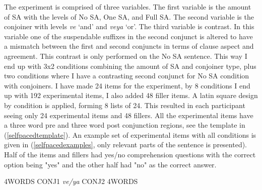 The experiment is comprised of three variables. The first variable is the amount of SA with the levels of No SA, One SA, and Full SA. The second variable is the conjoiner with levels \textit{ve} `and' and \textit{veya} `or'. The third variable is contrast. In this variable one of the suspendable suffixes in the second conjunct is altered to have a mismatch between the first and second conjuncts in terms of clause aspect and agreement. This contrast is only performed on the No SA sentence. This way I end up with 3x2 conditions combining the amount of SA and conjoiner type, plus two conditions where I have a contrasting second conjunct for No SA condition with conjoiners. I have made 24 items for the experiment, by 8 conditions I end up with 192 experimental items, I also added 48 filler items. A latin square design by condition is applied, forming 8 lists of 24. This resulted in each participant seeing only 24 experimental items and 48 fillers. All the experimental items have a three word pre and three word post conjunction regions, see the template in (\ref{selfpacedtemplate}). An example set of experimental items with all conditions is given in (\ref{selfpacedexamples}, only relevant parts of the sentence is presented). Half of the items and fillers had yes/no comprehension questions with the correct option being "yes" and the other half had "no" as the correct answer.
\begin{exe}
\ex \label{selfpacedtemplate}
4WORDS CONJ1 \textit{ve/ya} CONJ2 4WORDS
\end{exe}


